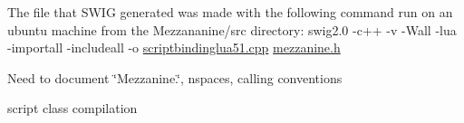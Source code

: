 The file that SWIG generated was made with the following command run on an ubuntu machine from the Mezzananine/src directory: swig2.0 -\/c++ -\/v -\/Wall -\/lua -\/importall -\/includeall -\/o \hyperlink{scriptbindinglua51_8cpp_source}{scriptbindinglua51.cpp} \hyperlink{mezzanine_8h}{mezzanine.h}

Need to document \char`\"{}Mezzanine.\char`\"{}, nspaces, calling conventions

script class compilation 